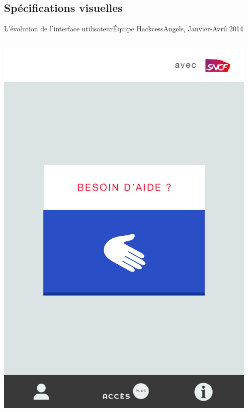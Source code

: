 \documentclass{beamer}
\begin{document}
\subsection{Spécifications visuelles}
\begin{frame}{L'évolution de l'interface utilisateur}{Équipe HackcessAngels, Janvier-Avril 2014}
    \begin{columns}
        \begin{column}{0.45\textwidth}
            \includegraphics[width=\textwidth]{alex-02/01-home_helpme.jpg}
        \end{column}
        \begin{column}{0.45\textwidth}

\end{column}
\end{columns}
\end{frame}
\end{document}
